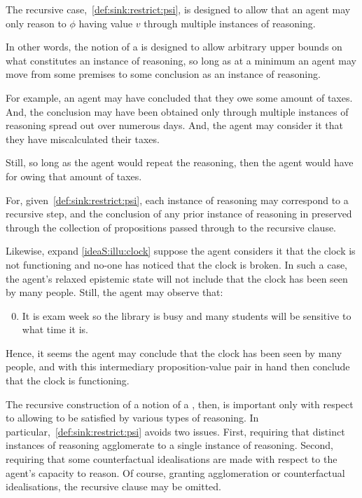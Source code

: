 \begin{note}
  The recursive case,~\ref{def:sink:restrict:psi}, is designed to allow that an agent may only reason to \(\phi\) having value \(v\) through multiple instances of reasoning.

  In other words, the notion of a \sink{} is designed to allow arbitrary upper bounds on what constitutes an instance of reasoning, so long as at a minimum an agent may move from some premises to some conclusion as an instance of reasoning.

  For example, an agent may have concluded that they owe some amount of taxes.
  And, the conclusion may have been obtained only through multiple instances of reasoning spread out over numerous days.
  And, the agent may consider it \epPAd{} that they have miscalculated their taxes.

  Still, so long as the agent would repeat the reasoning, then the agent would have \support{} for owing that amount of taxes.

  For, given~\ref{def:sink:restrict:psi}, each instance of reasoning may correspond to a recursive step, and the conclusion of any prior instance of reasoning in preserved through the collection of propositions passed through to the recursive clause.

  Likewise, expand \autoref{ideaS:illu:clock} suppose the agent considers it \epPAd{} that the clock is not functioning and no-one has noticed that the clock is broken.
  In such a case, the agent's relaxed epistemic state will not include that the clock has been seen by many people.
  Still, the agent may observe that:
  \begin{enumerate}
    \setcounter{enumi}{-1}
  \item It is exam week so the library is busy and many students will be sensitive to what time it is.
  \end{enumerate}
  Hence, it seems the agent may conclude that the clock has been seen by many people, and with this intermediary proposition-value pair in hand then conclude that the clock is functioning.
\end{note}

\begin{note}
  The recursive construction of a notion of a \sink{}, then, is important only with respect to allowing \ideaS{} to be satisfied by various types of reasoning.
  In particular,~\ref{def:sink:restrict:psi} avoids two issues.
  First, requiring that distinct instances of reasoning agglomerate to a single instance of reasoning.
  Second, requiring that some counterfactual idealisations are made with respect to the agent's capacity to reason.
  Of course, granting agglomeration or counterfactual idealisations, the recursive clause may be omitted.
\end{note}

